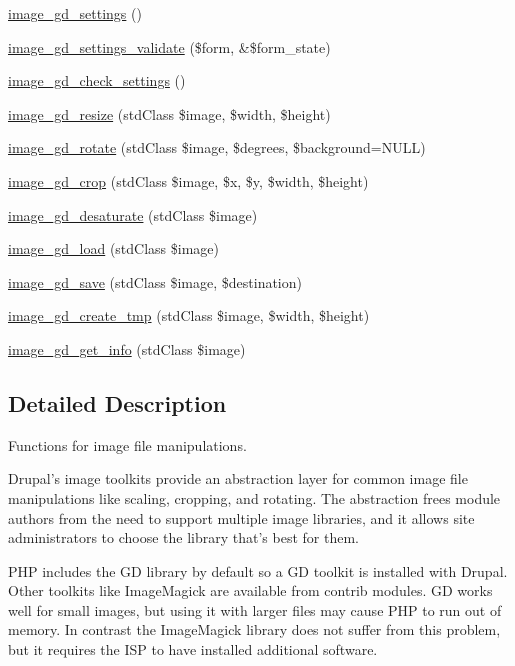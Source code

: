 \begin{DoxyCompactItemize}
\item 
\hyperlink{group__image_ga2a492c31e41c59af2b7e976e28886b15}{image\_\-gd\_\-settings} ()
\item 
\hyperlink{group__image_gaab4f4ec4e8bc9abc51939a4194848fbb}{image\_\-gd\_\-settings\_\-validate} (\$form, \&\$form\_\-state)
\item 
\hyperlink{group__image_ga1926e8b1932480b81427c1301e8eb4dc}{image\_\-gd\_\-check\_\-settings} ()
\item 
\hyperlink{group__image_ga8d0c1abb541e01ec7a76a57add14a0b2}{image\_\-gd\_\-resize} (stdClass \$image, \$width, \$height)
\item 
\hyperlink{group__image_gadfe1dec9bcb15c4b223acc64f35631d2}{image\_\-gd\_\-rotate} (stdClass \$image, \$degrees, \$background=NULL)
\item 
\hyperlink{group__image_ga80d6e99f7b538e40dac6b917bfff1bb1}{image\_\-gd\_\-crop} (stdClass \$image, \$x, \$y, \$width, \$height)
\item 
\hyperlink{group__image_ga2cb8090035dbb1a1e6a9c82cb52c9789}{image\_\-gd\_\-desaturate} (stdClass \$image)
\item 
\hyperlink{group__image_gaa3b2912916ff9cfec8c7c8df8f3f1d75}{image\_\-gd\_\-load} (stdClass \$image)
\item 
\hyperlink{group__image_ga840179ad0e5ef2ea7619de19cab2d225}{image\_\-gd\_\-save} (stdClass \$image, \$destination)
\item 
\hyperlink{group__image_gabb63f813bf7d644843d7fc9024b6e1ea}{image\_\-gd\_\-create\_\-tmp} (stdClass \$image, \$width, \$height)
\item 
\hyperlink{group__image_gae5b31eb967a96b6b109dd5ddf720ab42}{image\_\-gd\_\-get\_\-info} (stdClass \$image)
\end{DoxyCompactItemize}


\subsection{Detailed Description}
Functions for image file manipulations.

Drupal's image toolkits provide an abstraction layer for common image file manipulations like scaling, cropping, and rotating. The abstraction frees module authors from the need to support multiple image libraries, and it allows site administrators to choose the library that's best for them.

PHP includes the GD library by default so a GD toolkit is installed with Drupal. Other toolkits like ImageMagick are available from contrib modules. GD works well for small images, but using it with larger files may cause PHP to run out of memory. In contrast the ImageMagick library does not suffer from this problem, but it requires the ISP to have installed additional software.

